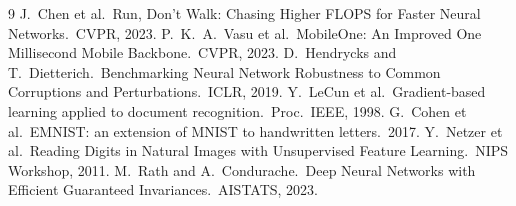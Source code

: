 \documentclass[11pt,a4paper]{article}
\begin{document}
\begin{thebibliography}{9}
J.~Chen et al.\ Run, Don't Walk: Chasing Higher FLOPS for Faster Neural Networks.\ CVPR, 2023.
P.~K.~A.~Vasu et al.\ MobileOne: An Improved One Millisecond Mobile Backbone.\ CVPR, 2023.
D.~Hendrycks and T.~Dietterich.\ Benchmarking Neural Network Robustness to Common Corruptions and Perturbations.\ ICLR, 2019.
Y.~LeCun et al.\ Gradient-based learning applied to document recognition.\ Proc.\ IEEE, 1998.
G.~Cohen et al.\ EMNIST: an extension of MNIST to handwritten letters.\ 2017.
Y.~Netzer et al.\ Reading Digits in Natural Images with Unsupervised Feature Learning.\ NIPS Workshop, 2011.
M.~Rath and A.~Condurache.\ Deep Neural Networks with Efficient Guaranteed Invariances.\ AISTATS, 2023.
\end{thebibliography}
\end{document}
